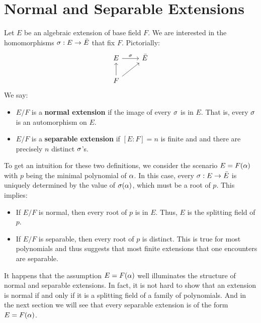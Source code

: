 \section{Normal and Separable Extensions}

Let $E$ be an algebraic extension of base field $F$. We are interested in the homomorphisms $\sigma: E \to \bar{E}$ that fix $F$. Pictorially:
\[
    \begin{tikzcd}
        E \arrow[r, "\sigma"]  & \bar{E} \\
        F \arrow[u] \arrow[ru] &        
    \end{tikzcd}
\]
We say:
\begin{itemize}
    \item $E/F$ is a \textbf{normal extension} if the image of every $\sigma$ is in $E$. That is, every $\sigma$ is an automorphism on $E$.
    \item $E/F$ is a \textbf{separable extension} if $[E : F] = n$ is finite and and there are precisely $n$ distinct $\sigma$'s.
\end{itemize}

To get an intuition for these two definitions, we consider the scenario $E = F(\alpha)$ with $p$ being the minimal polynomial of $\alpha$. In this case, every $\sigma: E \to \bar{E}$ is uniquely determined by the value of $\sigma(\alpha)$, which must be a root of $p$. This implies:
\begin{itemize}
    \item If $E/F$ is normal, then every root of $p$ is in $E$. Thus, $E$ is the splitting field of $p$.
    \item If $E/F$ is separable, then every root of $p$ is distinct. This is true for most polynomials and thus suggests that most finite extensions that one encounters are separable.
\end{itemize}

It happens that the assumption $E = F(\alpha)$ well illuminates the structure of normal and separable extensions. In fact, it is not hard to show that an extension is normal if and only if it is a splitting field of a family of polynomials. And in the next section we will see that every separable extension is of the form $E = F(\alpha)$.